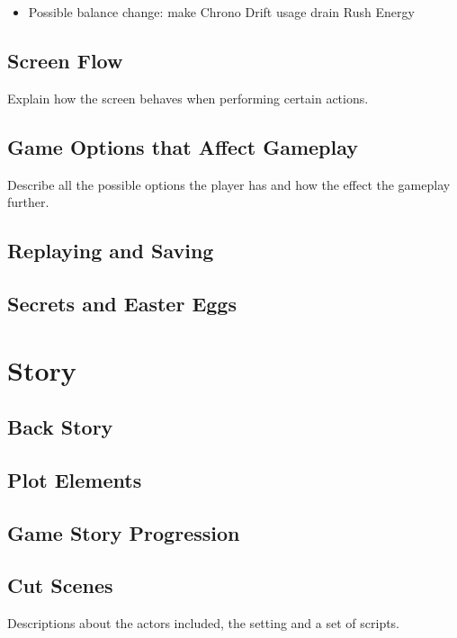 \documentclass[12pt]{article}
\begin{document}
\begin{itemize}
	\item Possible balance change: make Chrono Drift usage drain Rush Energy 
\end{itemize}

\subsection{Screen Flow}

Explain how the screen behaves when performing certain actions.

\subsection{Game Options that Affect Gameplay}

Describe all the possible options the player has and how the effect the gameplay further. 

\subsection{Replaying and Saving}

\subsection{Secrets and Easter Eggs}

\section{Story}

\subsection{Back Story}

\subsection{Plot Elements}

\subsection{Game Story Progression}

\subsection{Cut Scenes}

Descriptions about the actors included, the setting and a set of scripts.
\end{document}
